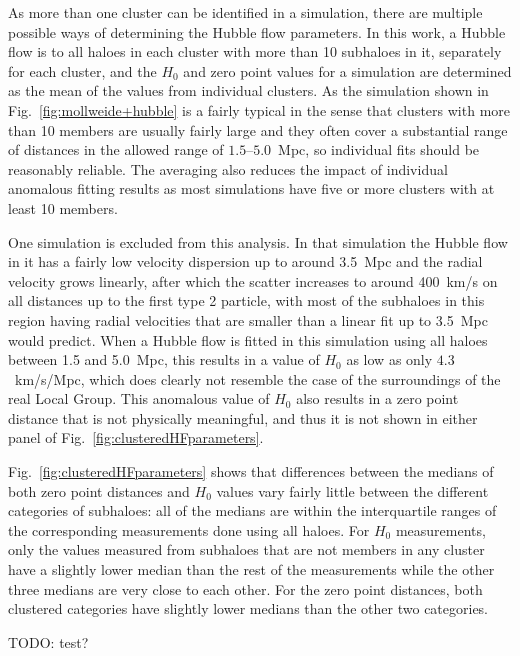 \documentclass[english, oneside]{HYgradu}
\begin{document}
As more than one cluster can be identified in a simulation, there are multiple possible ways of determining the Hubble flow parameters. In this work, a Hubble flow is to all haloes in each cluster with more than 10 subhaloes in it, separately for each cluster, and the $H_0$ and zero point values for a simulation are determined as the mean of the values from individual clusters. As the simulation shown in Fig.~\ref{fig:mollweide+hubble} is a fairly typical in the sense that clusters with more than 10 members are usually fairly large and they often cover a substantial range of distances in the allowed range of $1.5$--$5.0$~Mpc, so individual fits should be reasonably reliable. The averaging also reduces the impact of individual anomalous fitting results as most simulations have five or more clusters with at least 10 members.

One simulation is excluded from this analysis. In that simulation the Hubble flow in it has a fairly low velocity dispersion up to around 3.5~Mpc and the radial velocity grows linearly, after which the scatter increases to around 400~km/s on all distances up to the first type 2 particle, with most of the subhaloes in this region having radial velocities that are smaller than a linear fit up to 3.5~Mpc would predict. When a Hubble flow is fitted in this simulation using all haloes between 1.5 and 5.0~Mpc, this results in a value of $H_0$ as low as only $4.3$~km/s/Mpc, which does clearly not resemble the case of the surroundings of the real Local Group. This anomalous value of $H_0$ also results in a zero point distance that is not physically meaningful, and thus it is not shown in either panel of Fig.~\ref{fig:clusteredHFparameters}.

Fig.~\ref{fig:clusteredHFparameters} shows that differences between the medians of both zero point distances and $H_0$ values vary fairly little between the different categories of subhaloes: all of the medians are within the interquartile ranges of the corresponding measurements done using all haloes. For $H_0$ measurements, only the values measured from subhaloes that are not members in any cluster have a slightly lower median than the rest of the measurements while the other three medians are very close to each other. For the zero point distances, both clustered categories have slightly lower medians than the other two categories.

TODO: test?

\end{document}
